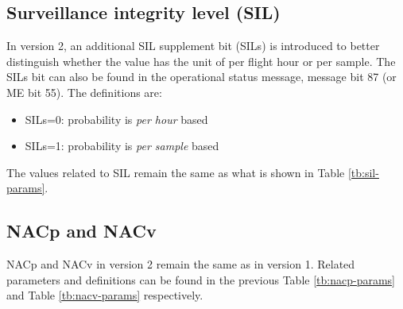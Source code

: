 \subsection{Surveillance integrity level (SIL)}

In version 2, an additional SIL supplement bit (SILs) is introduced to better distinguish whether the value has the unit of per flight hour or per sample. The SILs bit can also be found in the operational status message, message bit 87 (or ME bit 55). The definitions are:

\begin{itemize}
  \item SILs=0: probability is \emph{per hour} based
  \item SILs=1: probability is \emph{per sample} based
\end{itemize}


The values related to SIL remain the same as what is shown in Table \ref{tb:sil-params}.

\subsection{NACp and NACv}

NACp and NACv in version 2 remain the same as in version 1. Related parameters and definitions can be found in the previous Table \ref{tb:nacp-params} and Table \ref{tb:nacv-params} respectively.
